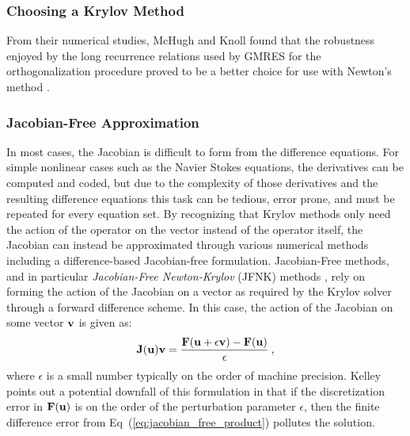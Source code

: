 \subsubsection{Choosing a Krylov Method}
\label{subsubsec:krylov_choice}
From their numerical studies, McHugh and Knoll found
that the robustness enjoyed by the long recurrence relations used by
GMRES for the orthogonalization procedure proved to be a better choice
for use with Newton's method
\citep{mchugh_inexact_1993,knoll_newton-krylov_1995}.

\subsubsection{Jacobian-Free Approximation}
\label{subsubsec:jacobian_free_approximation}
In most cases, the Jacobian is difficult to form from the difference
equations. For simple nonlinear cases such as the Navier Stokes
equations, the derivatives can be computed and coded, but due to the
complexity of those derivatives and the resulting difference equations
this task can be tedious, error prone, and must be repeated for every
equation set. By recognizing that Krylov methods only need the action
of the operator on the vector instead of the operator itself, the
Jacobian can instead be approximated through various numerical methods
including a difference-based Jacobian-free formulation. Jacobian-Free
methods, and in particular \textit{Jacobian-Free Newton-Krylov} (JFNK)
methods \citep{knoll_jacobian-free_2004}, rely on forming the action
of the Jacobian on a vector as required by the Krylov solver through a
forward difference scheme. In this case, the action of the Jacobian on
some vector $\mathbf{v}$ is given as:
\begin{equation}
  \mathbf{J}(\mathbf{u})\mathbf{v} = \frac{\mathbf{F}(\mathbf{u} + \epsilon \mathbf{v}) -
    \mathbf{F}(\mathbf{u})}{\epsilon}\:,
  \label{eq:jacobian_free_product}
\end{equation}
where $\epsilon$ is a small number typically on the order of machine
precision. Kelley \citep{kelley_iterative_1995} points out a potential
downfall of this formulation in that if the discretization error in
$\mathbf{F}(\mathbf{u})$ is on the order of the perturbation parameter
$\epsilon$, then the finite difference error from
Eq~(\ref{eq:jacobian_free_product}) pollutes the solution.

